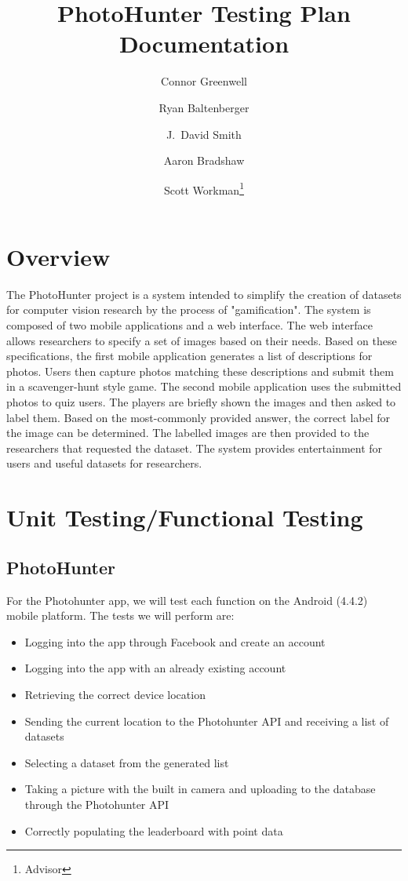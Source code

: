 \documentclass{article}
\title{PhotoHunter Testing Plan Documentation
}
\author{Connor Greenwell \and Ryan Baltenberger
  \and J.\ David Smith \and Aaron Bradshaw
\and Scott Workman\footnote{Advisor}}
\begin{document}
\maketitle

\section{Overview}
The PhotoHunter project is a system intended to simplify the creation of
datasets for computer vision research by the process of "gamification". The
system is composed of two mobile applications and a web interface. The web
interface allows researchers to specify a set of images based on their needs.
Based on these specifications, the first mobile application generates a list of
descriptions for photos. Users then capture photos matching these descriptions
and submit them in a scavenger-hunt style game. The second mobile application
uses the submitted photos to quiz users. The players are briefly shown the
images and then asked to label them. Based on the most-commonly provided
answer, the correct label for the image can be determined. The labelled images
are then provided to the researchers that requested the dataset. The system
provides entertainment for users and useful datasets for researchers.

\section{Unit Testing/Functional Testing}
\subsection{PhotoHunter}

For the Photohunter app, we will test each function on the Android (4.4.2)
mobile platform.  The tests we will perform are:
\begin{itemize}

  \item Logging into the app through Facebook and create an account

  \item Logging into the app with an already existing account

  \item Retrieving the correct device location

  \item Sending the current location to the Photohunter API and receiving
        a list of datasets

  \item Selecting a dataset from the generated list

  \item Taking a picture with the built in camera and uploading to the
        database through the Photohunter API

  \item Correctly populating the leaderboard with point data

\end{itemize}
\end{document}
